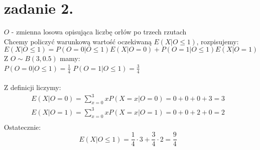 \documentclass{article}
\begin{document}
\section{zadanie 2.}
$O$ - zmienna losowa opisująca liczbę orłów po trzech rzutach
\\Chcemy policzyć warunkową wartość oczekiwaną $E(X|O\leq1)$, rozpisujemy:
$$
E(X|O\leq1) =  P(O=0|O\leq1)E(X|O=0)+ P(O=1|O\leq1)E(X|O=1)
$$
Z $O \sim B(3, 0.5)$ mamy:\\
$P(O=0|O\leq1) = \frac{1}{4}$
$P(O=1|O\leq1) = \frac{3}{4}$\\\\
Z definicji liczymy:
\begin{align*}
E(X|O=0) = \sum_{x=0}^3 xP(X=x|O=0) = 0 + 0 + 0 + 3 = 3\\
E(X|O=1) = \sum_{x=0}^3 xP(X=x|O=1) = 0 + 0 + 2 + 0 = 2\\
\end{align*}
Ostatecznie:
$$
E(X|O\leq1) = \frac{1}{4}\cdot3 + \frac{3}{4}\cdot2 = \frac9 4
$$
\clearpage
\end{document}
